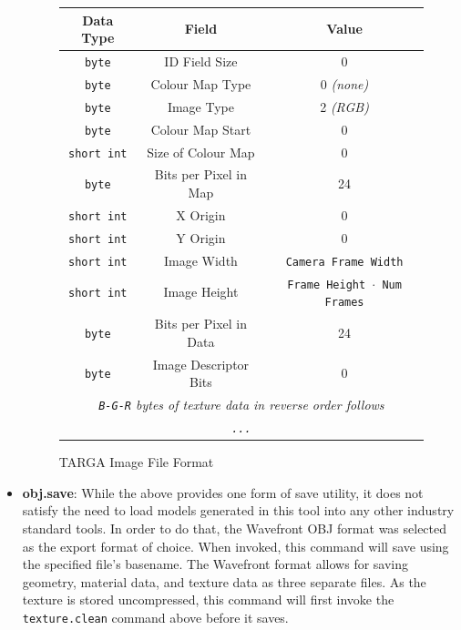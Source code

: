 \documentclass[a4paper,10pt]{article}
\begin{document}
\begin{itemize}
\begin{figure}
  \begin{center}
    \begin{tabular}{| c | c || c |} \hline
      \textbf{Data Type} & \textbf{Field} & \textbf{Value} \\ \hline
      \texttt{byte} & ID Field Size & 0 \\ \hline
      \texttt{byte} & Colour Map Type & 0 \textit{(none)} \\ \hline
      \texttt{byte} & Image Type & 2 \textit{(RGB)} \\ \hline
      \texttt{byte} & Colour Map Start & 0 \\ \hline
      \texttt{short int} & Size of Colour Map & 0 \\ \hline
      \texttt{byte} & Bits per Pixel in Map & 24 \\ \hline
      \texttt{short int} & X Origin & 0 \\ \hline
      \texttt{short int} & Y Origin & 0 \\ \hline
      \texttt{short int} & Image Width & \texttt{Camera Frame Width} \\ \hline
      \texttt{short int} & Image Height & \texttt{Frame Height $\cdot$ Num Frames} \\ \hline
      \texttt{byte} & Bits per Pixel in Data & 24 \\ \hline
      \texttt{byte} & Image Descriptor Bits & 0 \\  \hline
      \multicolumn{3}{|c|}{\textit{\texttt{B-G-R} bytes of texture data in reverse order follows}} \\
      \multicolumn{3}{|c|}{\textit{\texttt{...}}}
    \end{tabular}
  \end{center}
  \caption{TARGA Image File Format}
  \label{tgaformat}
\end{figure}

\item{\textbf{obj.save}: While the above provides one form of save utility, it does not satisfy the need to load models generated in this tool into any other industry standard tools. In order to do that, the Wavefront OBJ format\cite{objmtl} was selected as the export format of choice. When invoked, this command will save using the specified file's basename. The Wavefront format allows for saving geometry, material data, and texture data as three separate files. As the texture is stored uncompressed, this command will first invoke the \texttt{texture.clean} command above before it saves. 

}
\end{itemize}
\end{document}
